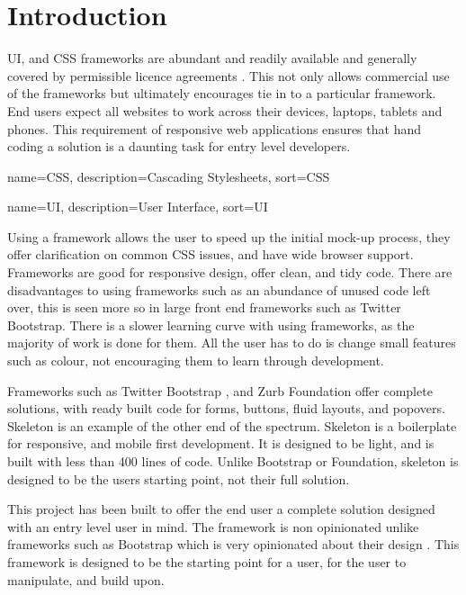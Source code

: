 \newpage
\chapter*{Introduction}

%
%

\gls{UI}, and \gls{CSS} frameworks are abundant and readily available and generally covered by permissible licence agreements \citep{CODY16}. This not only allows commercial use of the frameworks but ultimately encourages tie in to a particular framework. End users expect all websites to work across their devices, laptops, tablets and phones. This requirement of responsive web applications ensures that hand coding a solution is a daunting task for entry level developers.




%
{
  name={CSS},
  description={Cascading Stylesheets},
  sort=CSS
}
%


%
{
  name={UI},
  description={User Interface},
  sort=UI
}
%

Using a framework allows the user to speed up the initial mock-up process, they offer clarification on common \gls{CSS} issues, and have wide browser support. Frameworks are good for responsive design, offer clean, and tidy code. There are disadvantages to using frameworks such as an abundance of unused code left over, this is seen more so in large front end frameworks such as Twitter Bootstrap. There is a slower learning curve with using frameworks, as the majority of work is done for them. All the user has to do is change small features such as colour, not encouraging them to learn through development.

Frameworks such as Twitter Bootstrap \citep{SASS16}, and Zurb Foundation \citep{LESS16} offer complete solutions, with ready built code for forms, buttons, fluid layouts, and popovers. Skeleton \citep{SKEL16} is an example of the other end of the spectrum. Skeleton is a boilerplate for responsive, and mobile first development. It is designed to be light, and is built with less than 400 lines of code. Unlike Bootstrap or Foundation, skeleton is designed to be the users starting point, not their full solution. 

This project has been built to offer the end user a complete solution designed with an entry level user in mind. The framework is non opinionated unlike frameworks such as Bootstrap which is very opinionated about their design \citet{KEMH16}. This framework is designed to be the starting point for a user, for the user to manipulate, and build upon.

